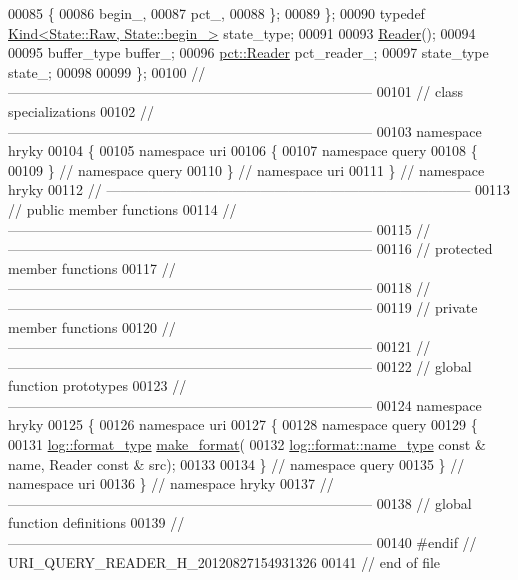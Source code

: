 \begin{DoxyCode}
00085         \{
00086             begin\_,
00087             pct\_,
00088         \};
00089     \};
00090     \textcolor{keyword}{typedef} \hyperlink{classhryky_1_1_kind}{Kind<State::Raw, State::begin_>} state\_type;
00091 
00093     \hyperlink{classhryky_1_1uri_1_1_reader}{Reader}();
00094 
00095     buffer\_type buffer\_;
00096     \hyperlink{classhryky_1_1uri_1_1pct_1_1_reader}{pct::Reader} pct\_reader\_;
00097     state\_type  state\_;
00098 
00099 \};
00100 \textcolor{comment}{//
      ------------------------------------------------------------------------------}
00101 \textcolor{comment}{// class specializations}
00102 \textcolor{comment}{//
      ------------------------------------------------------------------------------}
00103 \textcolor{keyword}{namespace }hryky
00104 \{
00105 \textcolor{keyword}{namespace }uri
00106 \{
00107 \textcolor{keyword}{namespace }query
00108 \{
00109 \} \textcolor{comment}{// namespace query}
00110 \} \textcolor{comment}{// namespace uri}
00111 \} \textcolor{comment}{// namespace hryky}
00112 \textcolor{comment}{//
      ------------------------------------------------------------------------------}
00113 \textcolor{comment}{// public member functions}
00114 \textcolor{comment}{//
      ------------------------------------------------------------------------------}
00115 \textcolor{comment}{//
      ------------------------------------------------------------------------------}
00116 \textcolor{comment}{// protected member functions}
00117 \textcolor{comment}{//
      ------------------------------------------------------------------------------}
00118 \textcolor{comment}{//
      ------------------------------------------------------------------------------}
00119 \textcolor{comment}{// private member functions}
00120 \textcolor{comment}{//
      ------------------------------------------------------------------------------}
00121 \textcolor{comment}{//
      ------------------------------------------------------------------------------}
00122 \textcolor{comment}{// global function prototypes}
00123 \textcolor{comment}{//
      ------------------------------------------------------------------------------}
00124 \textcolor{keyword}{namespace }hryky
00125 \{
00126 \textcolor{keyword}{namespace }uri
00127 \{
00128 \textcolor{keyword}{namespace }query
00129 \{
00131     \hyperlink{namespacehryky_1_1log_ad50448c3f934f1eacd5c1bcffe8111e1}{log::format_type} \hyperlink{namespacehryky_1_1uri_a4c47d905f62ff90b7026c9f3f6544a9b}{make_format}(
00132         \hyperlink{namespacehryky_1_1log_1_1format_ab7408d1e2ed2d648dbf9bba69eb74288}{log::format::name_type} \textcolor{keyword}{const} & name, Reader \textcolor{keyword}{const} & src);
00133 
00134 \} \textcolor{comment}{// namespace query}
00135 \} \textcolor{comment}{// namespace uri}
00136 \} \textcolor{comment}{// namespace hryky}
00137 \textcolor{comment}{//
      ------------------------------------------------------------------------------}
00138 \textcolor{comment}{// global function definitions}
00139 \textcolor{comment}{//
      ------------------------------------------------------------------------------}
00140 \textcolor{preprocessor}{#endif // URI\_QUERY\_READER\_H\_20120827154931326}
00141 \textcolor{preprocessor}{}\textcolor{comment}{// end of file}
\end{DoxyCode}
